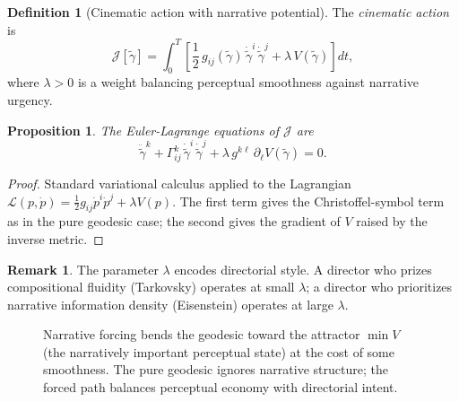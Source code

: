 \documentclass[12pt,a4paper]{article}
\theoremstyle{plain}
\newtheorem{proposition}[theorem]{Proposition}
\theoremstyle{definition}
\newtheorem{definition}[theorem]{Definition}
\newtheorem{remark}[theorem]{Remark}
\begin{document}
\begin{definition}[Cinematic action with narrative potential]
The \emph{cinematic action} is
\[
\mathcal{J}[\tilde\gamma]
= \int_0^T
\!\left[
\frac{1}{2}\,g_{ij}(\tilde\gamma)\,\dot{\tilde\gamma}^i\,\dot{\tilde\gamma}^j
+ \lambda\,V(\tilde\gamma)
\right]dt,
\]
where $\lambda > 0$ is a weight balancing perceptual smoothness against
narrative urgency.
\end{definition}

\begin{proposition}
The Euler-Lagrange equations of $\mathcal{J}$ are
\[
\ddot{\tilde\gamma}^k
+ \Gamma^k_{ij}\,\dot{\tilde\gamma}^i\,\dot{\tilde\gamma}^j
+ \lambda\,g^{k\ell}\,\partial_\ell V(\tilde\gamma)
= 0.
\]
\end{proposition}

\begin{proof}
Standard variational calculus applied to the Lagrangian
$\mathcal{L}(p,\dot p) = \tfrac{1}{2}g_{ij}\dot p^i\dot p^j + \lambda V(p)$.
The first term gives the Christoffel-symbol term as in the pure geodesic case;
the second gives the gradient of $V$ raised by the inverse metric.
\end{proof}

\begin{remark}
The parameter $\lambda$ encodes directorial style. A director who prizes
compositional fluidity (Tarkovsky) operates at small $\lambda$; a director who
prioritizes narrative information density (Eisenstein) operates at large
$\lambda$.
\end{remark}

\begin{figure}[h]
\centering
{}
\caption{Narrative forcing bends the geodesic toward the attractor $\min V$
(the narratively important perceptual state) at the cost of some smoothness.
The pure geodesic ignores narrative structure; the forced path balances
perceptual economy with directorial intent.}
\label{fig:forcing}
\end{figure}
\end{document}
